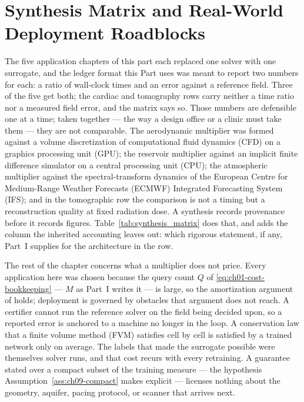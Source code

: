 
\chapter{Synthesis Matrix and Real-World Deployment Roadblocks}
\label{ch:part3-synthesis-matrix-and-real-world-deployment}
\label{sec:synthesis}

The five application chapters of this part each replaced one solver with one surrogate, and
the ledger format this Part uses was meant to report two numbers for each: a ratio of wall-clock times and an
error against a reference field. Three of the five get both; the cardiac and tomography rows
carry neither a time ratio nor a measured field error, and the matrix says so. Those
numbers are defensible one at a time; taken together --- the way a design office or a clinic must
take them --- they are not comparable. The aerodynamic multiplier was formed
against a volume discretization of computational fluid dynamics (CFD) on a graphics processing
unit (GPU); the reservoir multiplier against an implicit finite difference simulator on a
central processing unit (CPU); the atmospheric multiplier against the spectral-transform
dynamics of the European Centre for Medium-Range Weather Forecasts (ECMWF) Integrated
Forecasting System (IFS); and in the tomographic row the comparison is not a timing but
a reconstruction quality at fixed radiation dose. A
synthesis records provenance before it records figures.
Table~\ref{tab:synthesis_matrix} does that, and adds the column the inherited accounting
leaves out:
which rigorous statement, if any, Part~I supplies for the architecture in the row.

The rest of the chapter concerns what a multiplier does not price. Every application here
was chosen because the query count $Q$ of \eqref{eq:ch01-cost-bookkeeping} --- $M$ as Part~I writes it --- is large, so the
amortization argument of
 holds; deployment is governed
by obstacles that argument does not reach. A certifier cannot run the reference solver on
the field being decided upon, so a reported error is anchored to a machine no longer in the
loop. A conservation law that a finite volume method (FVM) satisfies cell by cell is
satisfied by a trained network only on average. The labels that made the surrogate possible
were themselves solver runs, and that cost recurs with every retraining. A guarantee stated
over a compact subset of the training measure --- the hypothesis
Assumption~\ref{ass:ch09-compact} makes explicit --- licenses nothing about the geometry,
aquifer, pacing protocol, or scanner that arrives next.

